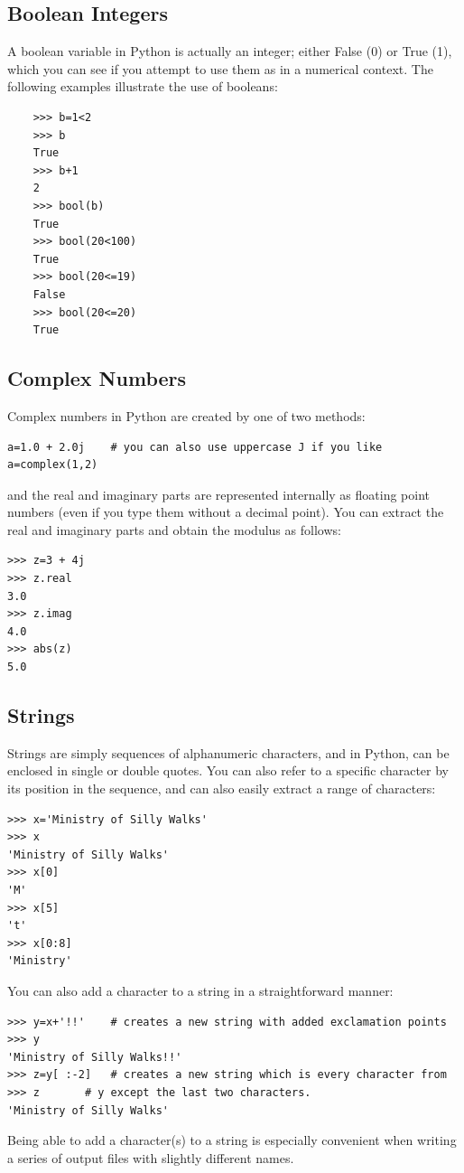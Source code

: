 \subsection{Boolean Integers}
\label{subsec-boolean}
A boolean variable in Python is actually an integer; either False (0) or True (1), which you can see if you attempt to use them as in a numerical context. The following examples illustrate the use of booleans: 
\begin{verbatim}
	>>> b=1<2 
	>>> b
	True
	>>> b+1
	2
	>>> bool(b)
	True
	>>> bool(20<100)
	True
	>>> bool(20<=19)
	False
	>>> bool(20<=20)
	True
\end{verbatim}
\subsection{Complex Numbers	}
\label{subsec-complex}
Complex numbers in Python are created by one of two methods: 
\begin{lstlisting}[frame=none]
a=1.0 + 2.0j 	# you can also use uppercase J if you like
a=complex(1,2)
\end{lstlisting}
and the real and imaginary parts are represented internally as floating point numbers (even if you type them without a decimal point). You can extract the real and imaginary parts and obtain the modulus  as follows:
\begin{lstlisting}[frame=none]
>>> z=3 + 4j 
>>> z.real
3.0
>>> z.imag
4.0
>>> abs(z)
5.0
\end{lstlisting}

\subsection{Strings}
\label{subsec-strings}
Strings are simply sequences of alphanumeric characters, and in Python, can be enclosed in single or double quotes. You can also refer to a specific character by its position in the sequence, and can also easily extract a range of characters:
\begin{lstlisting}[frame=none]
>>> x='Ministry of Silly Walks'
>>> x
'Ministry of Silly Walks'
>>> x[0]
'M'
>>> x[5]
't'
>>> x[0:8]
'Ministry'
\end{lstlisting}
You can also add a character to a string in a straightforward manner:
\begin{lstlisting}[frame=none]
>>> y=x+'!!'	# creates a new string with added exclamation points
>>> y
'Ministry of Silly Walks!!'
>>> z=y[ :-2]	# creates a new string which is every character from
>>> z		# y except the last two characters.
'Ministry of Silly Walks'
\end{lstlisting}
Being able to add a character(s) to a string is especially convenient when writing a series of output files with slightly different names. 

